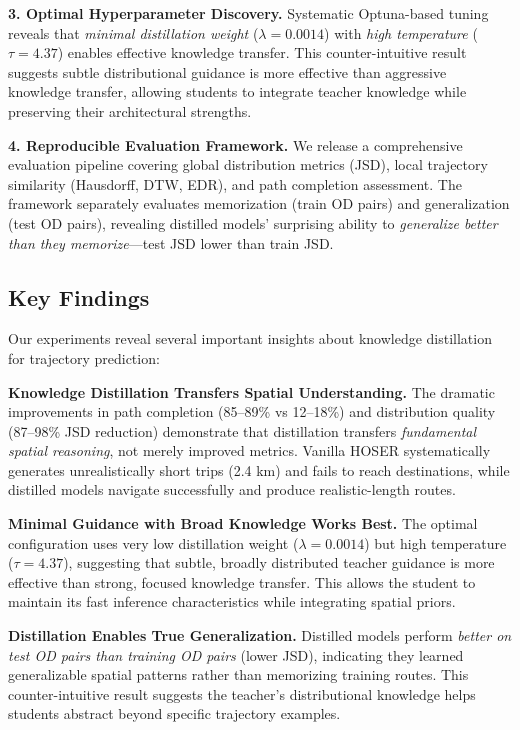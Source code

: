 \textbf{3. Optimal Hyperparameter Discovery.} Systematic Optuna-based tuning reveals that \emph{minimal distillation weight} ($\lambda = 0.0014$) with \emph{high temperature} ($\tau = 4.37$) enables effective knowledge transfer. This counter-intuitive result suggests subtle distributional guidance is more effective than aggressive knowledge transfer, allowing students to integrate teacher knowledge while preserving their architectural strengths.

\textbf{4. Reproducible Evaluation Framework.} We release a comprehensive evaluation pipeline covering global distribution metrics (JSD), local trajectory similarity (Hausdorff, DTW, EDR), and path completion assessment. The framework separately evaluates memorization (train OD pairs) and generalization (test OD pairs), revealing distilled models' surprising ability to \emph{generalize better than they memorize}—test JSD lower than train JSD.

\subsection{Key Findings}
\label{sec:conclusion-findings}

Our experiments reveal several important insights about knowledge distillation for trajectory prediction:

\textbf{Knowledge Distillation Transfers Spatial Understanding.} The dramatic improvements in path completion (85--89\% vs 12--18\%) and distribution quality (87--98\% JSD reduction) demonstrate that distillation transfers \emph{fundamental spatial reasoning}, not merely improved metrics. Vanilla HOSER systematically generates unrealistically short trips (2.4 km) and fails to reach destinations, while distilled models navigate successfully and produce realistic-length routes.

\textbf{Minimal Guidance with Broad Knowledge Works Best.} The optimal configuration uses very low distillation weight ($\lambda = 0.0014$) but high temperature ($\tau = 4.37$), suggesting that subtle, broadly distributed teacher guidance is more effective than strong, focused knowledge transfer. This allows the student to maintain its fast inference characteristics while integrating spatial priors.

\textbf{Distillation Enables True Generalization.} Distilled models perform \emph{better on test OD pairs than training OD pairs} (lower JSD), indicating they learned generalizable spatial patterns rather than memorizing training routes. This counter-intuitive result suggests the teacher's distributional knowledge helps students abstract beyond specific trajectory examples.


